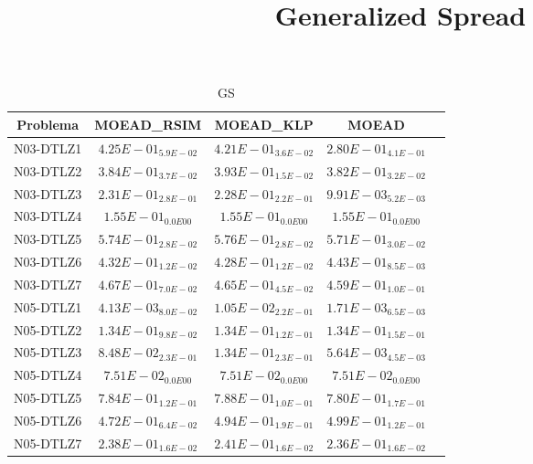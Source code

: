 \documentclass{article}
\title{Generalized Spread}
\author{}
\begin{document}
\maketitle
\begin{table*}[ht!]
\scriptsize
\caption{GS}
\centering\begin{tabular}{|c||c||c||c||c|} \hline
Problema &MOEAD_RSIM &MOEAD_KLP &MOEAD\\\hline
N03-DTLZ1 &$4.25E-01_{5.9E-02}$ &\cellcolor{gray25}$4.21E-01_{3.6E-02}$ &\cellcolor{gray95}$2.80E-01_{4.1E-01}$\\ 
\hline
N03-DTLZ2 &\cellcolor{gray25}$3.84E-01_{3.7E-02}$ &$3.93E-01_{1.5E-02}$ &\cellcolor{gray95}$3.82E-01_{3.2E-02}$\\ 
\hline
N03-DTLZ3 &$2.31E-01_{2.8E-01}$ &\cellcolor{gray25}$2.28E-01_{2.2E-01}$ &\cellcolor{gray95}$9.91E-03_{5.2E-03}$\\ 
\hline
N03-DTLZ4 &\cellcolor{gray95}$1.55E-01_{0.0E00}$ &\cellcolor{gray25}$1.55E-01_{0.0E00}$ &$1.55E-01_{0.0E00}$\\ 
\hline
N03-DTLZ5 &\cellcolor{gray25}$5.74E-01_{2.8E-02}$ &$5.76E-01_{2.8E-02}$ &\cellcolor{gray95}$5.71E-01_{3.0E-02}$\\ 
\hline
N03-DTLZ6 &\cellcolor{gray25}$4.32E-01_{1.2E-02}$ &\cellcolor{gray95}$4.28E-01_{1.2E-02}$ &$4.43E-01_{8.5E-03}$\\ 
\hline
N03-DTLZ7 &$4.67E-01_{7.0E-02}$ &\cellcolor{gray25}$4.65E-01_{4.5E-02}$ &\cellcolor{gray95}$4.59E-01_{1.0E-01}$\\ 
\hline
N05-DTLZ1 &\cellcolor{gray25}$4.13E-03_{8.0E-02}$ &$1.05E-02_{2.2E-01}$ &\cellcolor{gray95}$1.71E-03_{6.5E-03}$\\ 
\hline
N05-DTLZ2 &\cellcolor{gray95}$1.34E-01_{9.8E-02}$ &\cellcolor{gray25}$1.34E-01_{1.2E-01}$ &$1.34E-01_{1.5E-01}$\\ 
\hline
N05-DTLZ3 &\cellcolor{gray25}$8.48E-02_{2.3E-01}$ &$1.34E-01_{2.3E-01}$ &\cellcolor{gray95}$5.64E-03_{4.5E-03}$\\ 
\hline
N05-DTLZ4 &\cellcolor{gray95}$7.51E-02_{0.0E00}$ &\cellcolor{gray25}$7.51E-02_{0.0E00}$ &$7.51E-02_{0.0E00}$\\ 
\hline
N05-DTLZ5 &\cellcolor{gray25}$7.84E-01_{1.2E-01}$ &$7.88E-01_{1.0E-01}$ &\cellcolor{gray95}$7.80E-01_{1.7E-01}$\\ 
\hline
N05-DTLZ6 &\cellcolor{gray95}$4.72E-01_{6.4E-02}$ &\cellcolor{gray25}$4.94E-01_{1.9E-01}$ &$4.99E-01_{1.2E-01}$\\ 
\hline
N05-DTLZ7 &\cellcolor{gray25}$2.38E-01_{1.6E-02}$ &$2.41E-01_{1.6E-02}$ &\cellcolor{gray95}$2.36E-01_{1.6E-02}$\\ 

\end{tabular}
\end{table*}
\end{document}
